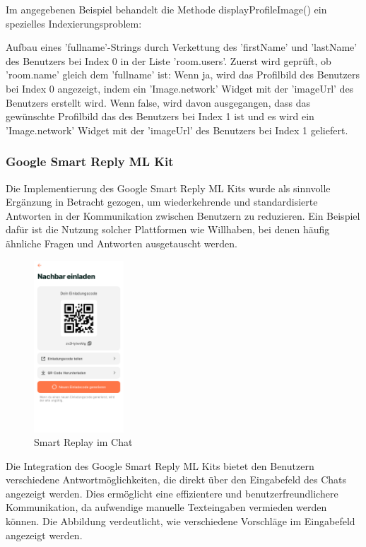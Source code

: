 Im angegebenen Beispiel behandelt die Methode displayProfileImage() ein spezielles Indexierungsproblem:

Aufbau eines 'fullname'-Strings durch Verkettung des 'firstName' und 'lastName' des Benutzers bei Index 0 in der Liste 'room.users'.
Zuerst wird geprüft, ob 'room.name' gleich dem 'fullname' ist:
Wenn ja, wird das Profilbild des Benutzers bei Index 0 angezeigt, indem ein 'Image.network' Widget mit der 'imageUrl' des Benutzers erstellt wird.
Wenn false, wird davon ausgegangen, dass das gewünschte Profilbild das des Benutzers bei Index 1 ist und es wird ein 'Image.network' Widget mit der 'imageUrl' des Benutzers bei Index 1 geliefert.


\subsubsection{Google Smart Reply ML Kit}
Die Implementierung des Google Smart Reply ML Kits wurde als sinnvolle Ergänzung in Betracht gezogen, um wiederkehrende und standardisierte Antworten in der Kommunikation zwischen Benutzern zu reduzieren. Ein Beispiel dafür ist die Nutzung solcher Plattformen wie Willhaben, bei denen häufig ähnliche Fragen und Antworten ausgetauscht werden.

\begin{figure}[H]
  \centering
  \includegraphics[width=0.3\textwidth]{pics/einladecode-page.png}
  \caption{Smart Replay im Chat}
  \label{fig:einladecode}
\end{figure}

Die Integration des Google Smart Reply ML Kits bietet den Benutzern verschiedene Antwortmöglichkeiten, die direkt über den Eingabefeld des Chats angezeigt werden. Dies ermöglicht eine effizientere und benutzerfreundlichere Kommunikation, da aufwendige manuelle Texteingaben vermieden werden können. Die Abbildung verdeutlicht, wie verschiedene Vorschläge im Eingabefeld angezeigt werden.

